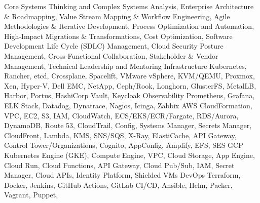 \begin{cvskills}
    \cvskill
        { Core }
        {
          Systems Thinking and Complex Systems Analysis,
          Enterprise Architecture \& Roadmapping,
          Value Stream Mapping \& Workflow Engineering,
          Agile Methodologies \& Iterative Development,
          Process Optimization and Automation,
          High-Impact Migrations \& Transformations,
          Cost Optimization,
          Software Development Life Cycle (SDLC) Management,
          Cloud Security Posture Management,
          Cross-Functional Collaboration,
          Stakeholder \& Vendor Management,
          Technical Leadership and Mentoring
        }
    \cvskill
        { Infrastructure }
        {
          Kubernetes,
          Rancher,
          etcd,
          Crossplane,
          Spacelift,
          VMware vSphere,
          KVM/QEMU,
          Proxmox,
          Xen,
          Hyper-V,
          Dell EMC,
          NetApp,
          Ceph/Rook,
          Longhorn,
          GlusterFS,
          MetalLB,
          Harbor,
          Portus,
          HashiCorp Vault,
          Keycloak
        }
    \cvskill
        { Observability }
        {
          Prometheus,
          Grafana,
          ELK Stack,
          Datadog,
          Dynatrace,
          Nagios,
          Icinga,
          Zabbix
        }
    \cvskill
        { AWS }
        {
          CloudFormation,
          VPC,
          EC2,
          S3,
          IAM,
          CloudWatch,
          ECS/EKS/ECR/Fargate,
          RDS/Aurora,
          DynamoDB,
          Route 53,
          CloudTrail,
          Config,
          Systems Manager,
          Secrets Manager,
          CloudFront,
          Lambda,
          KMS,
          SNS/SQS,
          X-Ray,
          ElastiCache,
          API Gateway,
          Control Tower/Organizations,
          Cognito,
          AppConfig,
          Amplify,
          EFS,
          SES
        }
    \cvskill
        { GCP }
        {
          Kubernetes Engine (GKE),
          Compute Engine,
          VPC,
          Cloud Storage,
          App Engine,
          Cloud Run,
          Cloud Functions,
          API Gateway,
          Cloud Pub/Sub,
          IAM,
          Secret Manager,
          Cloud APIs,
          Identity Platform,
          Shielded VMs
        }
    \cvskill
        { DevOps }
        {
          Terraform,
          Docker,
          Jenkins,
          GitHub Actions,
          GitLab CI/CD,
          Ansible,
          Helm,
          Packer,
          Vagrant,
          Puppet,
}
\end{cvskills}
